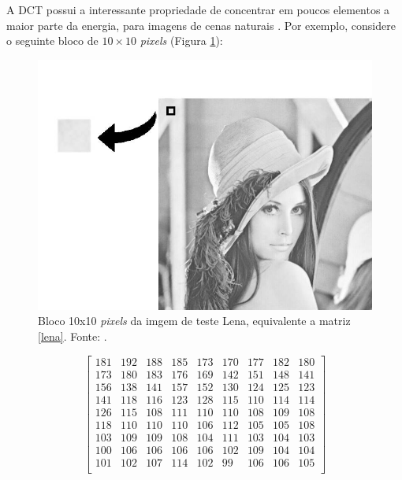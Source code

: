A DCT possui a interessante propriedade de concentrar em poucos elementos a maior parte da energia, para imagens de cenas naturais \cite{khayam2003discrete}. Por exemplo, considere o seguinte bloco de $10 \times 10$ \textit{pixels} (Figura \ref{PEDACO_LENA}):
\begin{figure}[h]
	\centering
	\includegraphics[scale=0.4]{figuras/lena_quadrado.jpg}
	\caption{Bloco 10x10 \textit{pixels} da imgem de teste Lena, equivalente a matriz \ref{lena}. Fonte: \cite{imagensTeste}.}
	\label{PEDACO_LENA}
\end{figure}
\begin{center}
\begin{equation}
\label{lena}
\begin{bmatrix}
  181&  192&  188&  185&  173&  170&  177&  182&  180\\
  173&  180&  183&  176&  169&  142&  151&  148&  141\\
  156&  138&  141&  157&  152&  130&  124&  125&  123\\
  141&  118&  116&  123&  128&  115&  110&  114&  114\\
  126&  115&  108&  111&  110&  110&  108&  109&  108\\
  118&  110&  110&  110&  106&  112&  105&  105&  108\\
  103&  109&  109&  108&  104&  111&  103&  104&  103\\
  100&  106&  106&  106&  106&  102&  109&  104&  104\\
  101&  102&  107&  114&  102&   99&  106&  106&  105\\
\end{bmatrix}
\end{equation}
\end{center}

